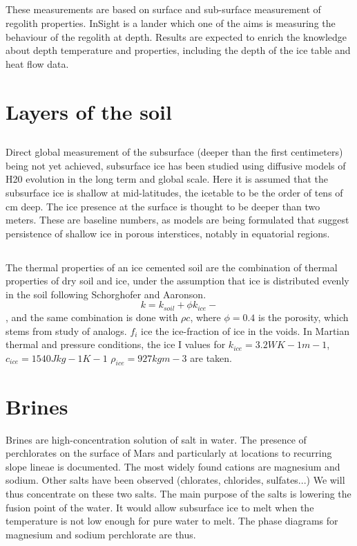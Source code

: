 \documentclass{report}
\begin{document}
    \subsection{}
    These measurements are based on surface and sub-surface measurement of regolith properties. InSight is a lander which one of the aims is measuring the behaviour of the regolith at depth. Results are expected to enrich the knowledge about depth temperature and properties, including the depth of the ice table and heat flow data. 

\section{Layers of the soil}
    \subsection{}
    Direct global measurement of the subsurface (deeper than the first centimeters) being not yet achieved, subsurface ice has been studied using diffusive models of H20 evolution in the long term and global scale. Here it is assumed that the subsurface ice is shallow at mid-latitudes, the icetable to be the order of tens of cm deep. The ice presence at the surface is thought to be deeper than two meters. 
    These are baseline numbers, as models are being formulated that suggest persistence of shallow ice in porous interstices, notably in equatorial regions.
    
    \subsection{}
    The thermal properties of an ice cemented soil are the combination of thermal properties of dry soil and ice, under the assumption that ice is distributed evenly in the soil following Schorghofer and Aaronson. 
    \[k = k_{soil} + \phi k_{ice}-\],
    and the same combination is done with $\rho c$, where $\phi = 0.4$ is the porosity, which stems from study of analogs. $f_i$ ice the ice-fraction of ice in the voids. In Martian thermal and pressure conditions, the ice I values for $k_{ice}=3.2WK-1m-1 $, $c_{ice} = 1540 J kg-1K-1$ $\rho _{ice}=927 kg m-3$ are taken.
    
\section{Brines}
    Brines are high-concentration solution of salt in water. The presence of perchlorates on the surface of Mars and particularly at locations to recurring slope lineae is documented. The most widely found cations are magnesium and sodium.
    Other salts have been observed (chlorates, chlorides, sulfates...)
    We will thus concentrate on these two salts. 
    The main purpose of the salts is lowering the fusion point of the water. It would allow subsurface ice to melt when the temperature is not low enough for pure water to melt. The phase diagrams for magnesium and sodium perchlorate are thus. 
    
\end{document}
